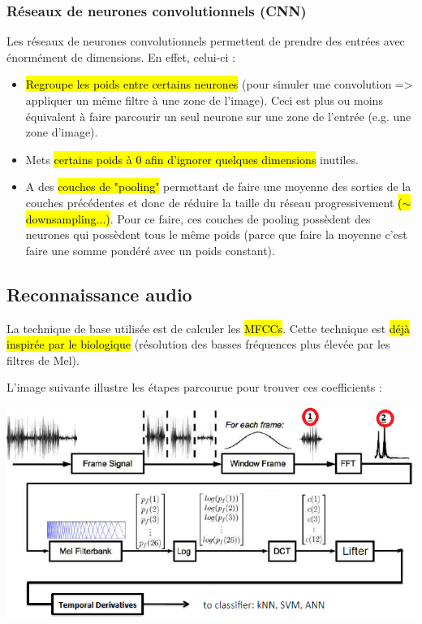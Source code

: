 \documentclass[letterpaper, 12pt]{article}
\newcommand{\alinea}{
\hspace*{0.5cm}}
\begin{document}
			\subsubsection{Réseaux de neurones convolutionnels (CNN)}
				\alinea Les réseaux de neurones convolutionnels permettent de prendre des entrées avec énormément de dimensions.
					En effet, celui-ci :
					\begin{itemize}
						\setlength\itemsep{0cm}
						\item \hl{Regroupe les poids entre certains neurones} (pour simuler une convolution => appliquer un même filtre 
							à une zone de l'image). Ceci est plus ou moins équivalent à faire parcourir un seul neurone sur
							une zone de l'entrée (e.g. une zone d'image).
						\item Mets \hl{certains poids à 0 afin d'ignorer quelques dimensions} inutiles.
						\item A des \hl{couches de "pooling"} permettant de faire une moyenne des sorties de la couches précédentes
							et donc de réduire la taille du réseau progressivement \hl{($\sim$downsampling...)}. Pour ce faire,
							ces couches de pooling possèdent des neurones qui possèdent tous le même poids (parce que faire la moyenne
							c'est faire une somme pondéré avec un poids constant).
					\end{itemize}
		\subsection{Reconnaissance audio}
			\alinea La technique de base utilisée est de calculer les \hl{MFCCs}. Cette technique est \hl{déjà inspirée par le biologique}
				(résolution des basses fréquences plus élevée par les filtres de Mel).
				
				
				L'image suivante illustre les étapes
				parcourue pour trouver ces coefficients : 
			\begin{center}
				\includegraphics[width=6in]{Images/mfcc}
			\end{center}
\end{document}
